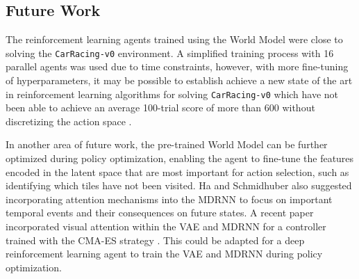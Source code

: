 \subsection{Future Work}

The reinforcement learning agents trained using the World Model were close to solving the \texttt{CarRacing-v0} environment. A simplified training process with 16 parallel agents was used due to time constraints, however, with more fine-tuning of hyperparameters, it may be possible to establish achieve a new state of the art in reinforcement learning algorithms for solving \texttt{CarRacing-v0} which have not been able to achieve an average 100-trial score of more than 600 without discretizing the action space \cite{3.0, 3.1, 3.2}.

In another area of future work, the pre-trained World Model can be further optimized during policy optimization, enabling the agent to fine-tune the features encoded in the latent space that are most important for action selection, such as identifying which tiles have not been visited. Ha and Schmidhuber also suggested incorporating attention mechanisms into the MDRNN to focus on important temporal events and their consequences on future states. A recent paper incorporated visual attention within the VAE and MDRNN for a controller trained with the CMA-ES strategy \cite{1.1}. This could be adapted for a deep reinforcement learning agent to train the VAE and MDRNN during policy optimization.